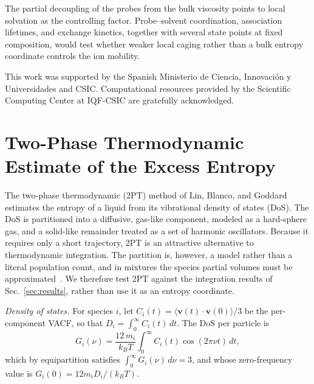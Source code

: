 \documentclass[aps,pre,twocolumn,superscriptaddress,floatfix]{revtex4-2}
\begin{document}
The partial decoupling of the probes from the bulk viscosity points to local solvation as the controlling factor. Probe--solvent coordination, association lifetimes, and exchange kinetics, together with several state points at fixed composition, would test whether weaker local caging rather than a bulk entropy coordinate controls the ion mobility.

\begin{acknowledgments}
This work was supported by the Spanish Ministerio de Ciencia, Innovaci{\'o}n y Universidades and CSIC. Computational resources provided by the Scientific Computing Center at IQF-CSIC are gratefully acknowledged.
\end{acknowledgments}

\clearpage
\appendix
\section{Two-Phase Thermodynamic Estimate of the Excess Entropy}
\label{app:2pt}

The two-phase thermodynamic (2PT) method of Lin, Blanco, and Goddard~\cite{Lin2003} estimates the entropy of a liquid from its vibrational density of states (DoS). The DoS is partitioned into a diffusive, gas-like component, modeled as a hard-sphere gas, and a solid-like remainder treated as a set of harmonic oscillators. Because it requires only a short trajectory, 2PT is an attractive alternative to thermodynamic integration. The partition is, however, a model rather than a literal population count, and in mixtures the species partial volumes must be approximated~\cite{Lai2012}. We therefore test 2PT against the integration results of Sec.~\ref{sec:results}, rather than use it as an entropy coordinate.

\emph{Density of states.} For species $i$, let $C_i(t)=\langle\mathbf v(t)\cdot\mathbf v(0)\rangle/3$ be the per-component VACF, so that $D_i=\int_0^\infty C_i(t)\,dt$. The DoS per particle is
\begin{equation}
G_i(\nu)=\frac{12\,m_i}{k_BT}\int_0^\infty C_i(t)\cos(2\pi\nu t)\,dt,
\label{eq:2pt_dos}
\end{equation}
which by equipartition satisfies $\int_0^\infty G_i(\nu)\,d\nu=3$, and whose zero-frequency value is $G_i(0)=12m_iD_i/(k_BT)$.
\end{document}
